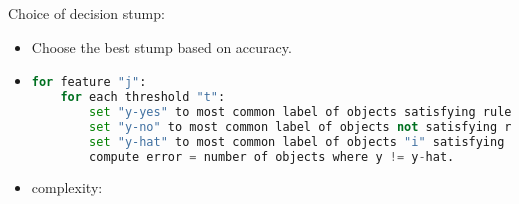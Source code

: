 \documentclass[11pt]{article}
\theoremstyle{definition}
\begin{document}
Choice of decision stump:
\begin{itemize}
    \item Choose the best stump based on accuracy.
    \item 
\begin{lstlisting}[language=Python, caption=Decision stmp learning pseudo-code]
for feature "j":
    for each threshold "t":
        set "y-yes" to most common label of objects satisfying rule.
        set "y-no" to most common label of objects not satisfying rule.
        set "y-hat" to most common label of objects "i" satisfying rule.
        compute error = number of objects where y != y-hat.
\end{lstlisting}
    \item complexity: 
\end{itemize}



\end{document}
